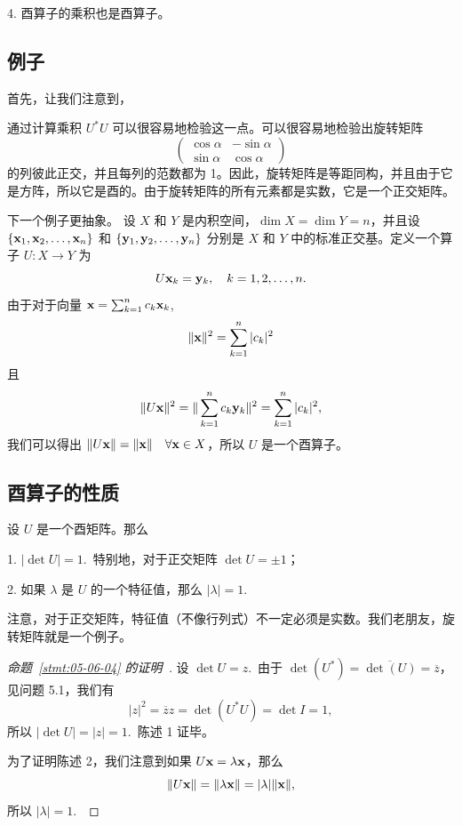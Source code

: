 4. 酉算子的乘积也是酉算子。

\subsection{例子}\label{sec:05-06-02}

首先，让我们注意到，


\noindent 通过计算乘积 $U^*U$ 可以很容易地检验这一点。可以很容易地检验出旋转矩阵 $$\begin{pmatrix} \cos \alpha & -\sin \alpha \\ \sin \alpha & \cos \alpha \end{pmatrix}$$
 的列彼此正交，并且每列的范数都为 1。因此，旋转矩阵是等距同构，并且由于它是方阵，所以它是酉的。由于旋转矩阵的所有元素都是实数，它是一个正交矩阵。

下一个例子更抽象。
设 $X$ 和 $Y$ 是内积空间，$\dim X = \dim Y = n$，并且设 $\{\mathbf{x}_1, \mathbf{x}_2, \dots, \mathbf{x}_n\}$ 和 $\{\mathbf{y}_1, \mathbf{y}_2, \dots, \mathbf{y}_n\}$ 分别是 $X$ 和 $Y$ 中的标准正交基。定义一个算子 $U: X \to Y$ 为
$$U\mathbf{x}_k = \mathbf{y}_k, \quad k = 1, 2, \dots, n.$$
由于对于向量 $\mathbf{x} = \sum_{k=1}^n c_k \mathbf{x}_k$,
$$\|\mathbf{x}\|^2 = \sum_{k=1}^n |c_k|^2$$ 且
$$\|U\mathbf{x}\|^2 = \|\sum_{k=1}^n c_k \mathbf{y}_k\|^2 = \sum_{k=1}^n |c_k|^2,$$
我们可以得出 $\|U\mathbf{x}\| = \|\mathbf{x}\| \quad \forall \mathbf{x} \in X$，所以 $U$ 是一个酉算子。

\subsection{酉算子的性质}\label{sec:05-06-03}

\begin{proposition}\label{stmt:05-06-04}
设 $U$ 是一个酉矩阵。那么
\end{proposition}

1. $|\det U| = 1$.~特别地，对于正交矩阵 $\det U = \pm 1$；

2. 如果 $\lambda$ 是 $U$ 的一个特征值，那么 $|\lambda| = 1$.~

\begin{remark*}
注意，对于正交矩阵，特征值（不像行列式）不一定必须是实数。我们老朋友，旋转矩阵就是一个例子。
\end{remark*}


\begin{proof}[\normalfont\heiti 命题~\ref{stmt:05-06-04} 的证明~\nopunct]设 $\det U = z$.~由于 $\det(U^*) = \overline{\det(U)} = \overline z$，见问题 5.1，我们有
$$|z|^2 = \overline{z}z = \det(U^*U) = \det I = 1,$$
所以 $|\det U| = |z| = 1$.~陈述 1 证毕。

为了证明陈述 2，我们注意到如果 $U\mathbf{x} = \lambda \mathbf{x}$，那么
$$\|U\mathbf{x}\| = \|\lambda \mathbf{x}\| = |\lambda|\|\mathbf{x}\|,$$
所以 $|\lambda| = 1$.~\end{proof}

